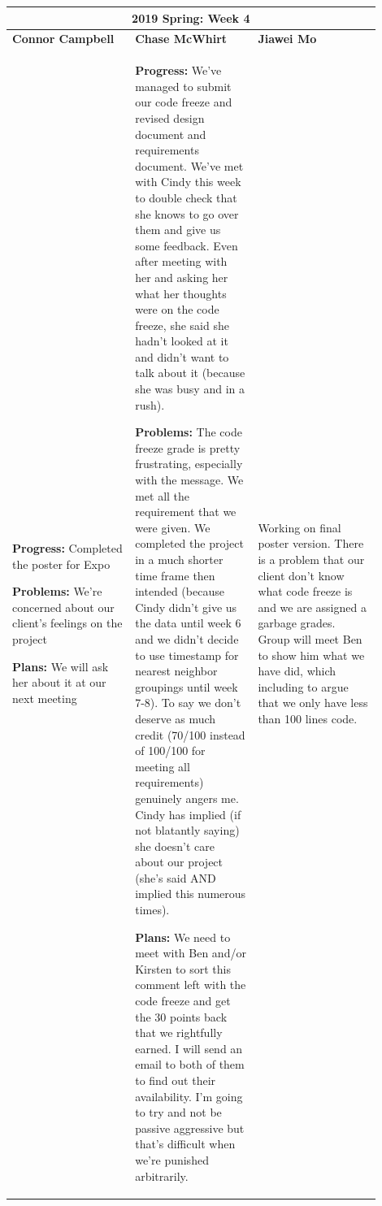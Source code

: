 \documentclass[10pt,journal,compsoc, draftclsnofoot,onecolumn]{IEEEtran}
\begin{document}
\begin{center}
\begin{tabular}{|p{0.3\linewidth}|p{0.3\linewidth}|p{0.3\linewidth}|}
\hline
\multicolumn{3}{|c|}{\textbf{2019 Spring: Week 4}} \\
\hline
\textbf{Connor Campbell} & \textbf{Chase McWhirt} & \textbf{Jiawei Mo} \\ [0.5ex]
\hline\hline

\textbf{Progress:} Completed the poster for Expo

\textbf{Problems:} We're concerned about our client's feelings on the project

\textbf{Plans:} We will ask her about it at our next meeting
&
\textbf{Progress:} We've managed to submit our code freeze and revised design document and requirements document.
We've met with Cindy this week to double check that she knows to go over them and give us some feedback.
Even after meeting with her and asking her what her thoughts were on the code freeze, she said she hadn't looked at it and didn't want to talk about it (because she was busy and in a rush). 

\textbf{Problems:} The code freeze grade is pretty frustrating, especially with the message.
We met all the requirement that we were given.
We completed the project in a much shorter time frame then intended (because Cindy didn't give us the data until week 6 and we didn't decide to use timestamp for nearest neighbor groupings until week 7-8).
To say we don't deserve as much credit (70/100 instead of 100/100 for meeting all requirements) genuinely angers me.
Cindy has implied (if not blatantly saying) she doesn't care about our project (she's said AND implied this numerous times).

\textbf{Plans:} We need to meet with Ben and/or Kirsten to sort this comment left with the code freeze and get the 30 points back that we rightfully earned.
I will send an email to both of them to find out their availability.
I'm going to try and not be passive aggressive but that's difficult when we're punished arbitrarily.
&
Working on final poster version. There is a problem that our client don't know what code freeze is and we are assigned a garbage grades. Group will meet Ben to show him what we have did, which including to argue that we only have less than 100 lines code.
\\ \hline
\end{tabular}
\end{center}
\end{document}
